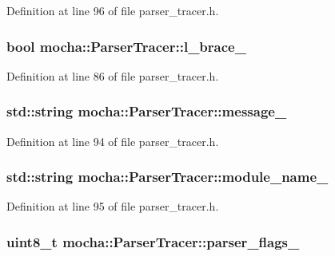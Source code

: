 Definition at line 96 of file parser\_\-tracer.h.

\hypertarget{classmocha_1_1_parser_tracer_aff95ee8b66288b929029026324959be4}{
\subsubsection[{l\_\-brace\_\-}]{\setlength{\rightskip}{0pt plus 5cm}bool {\bf mocha::ParserTracer::l\_\-brace\_\-}}}
\label{classmocha_1_1_parser_tracer_aff95ee8b66288b929029026324959be4}


Definition at line 86 of file parser\_\-tracer.h.

\hypertarget{classmocha_1_1_parser_tracer_a11ac093f19a1e36dd2386c423dc96d04}{
\subsubsection[{message\_\-}]{\setlength{\rightskip}{0pt plus 5cm}std::string {\bf mocha::ParserTracer::message\_\-}}}
\label{classmocha_1_1_parser_tracer_a11ac093f19a1e36dd2386c423dc96d04}


Definition at line 94 of file parser\_\-tracer.h.

\hypertarget{classmocha_1_1_parser_tracer_ab5d8b29a4acd4d80c83d3d7d5f70f4cf}{
\subsubsection[{module\_\-name\_\-}]{\setlength{\rightskip}{0pt plus 5cm}std::string {\bf mocha::ParserTracer::module\_\-name\_\-}}}
\label{classmocha_1_1_parser_tracer_ab5d8b29a4acd4d80c83d3d7d5f70f4cf}


Definition at line 95 of file parser\_\-tracer.h.

\hypertarget{classmocha_1_1_parser_tracer_a2b47370146eb41cae42152a5aec44aa9}{
\subsubsection[{parser\_\-flags\_\-}]{\setlength{\rightskip}{0pt plus 5cm}uint8\_\-t {\bf mocha::ParserTracer::parser\_\-flags\_\-}}}
\label{classmocha_1_1_parser_tracer_a2b47370146eb41cae42152a5aec44aa9}


